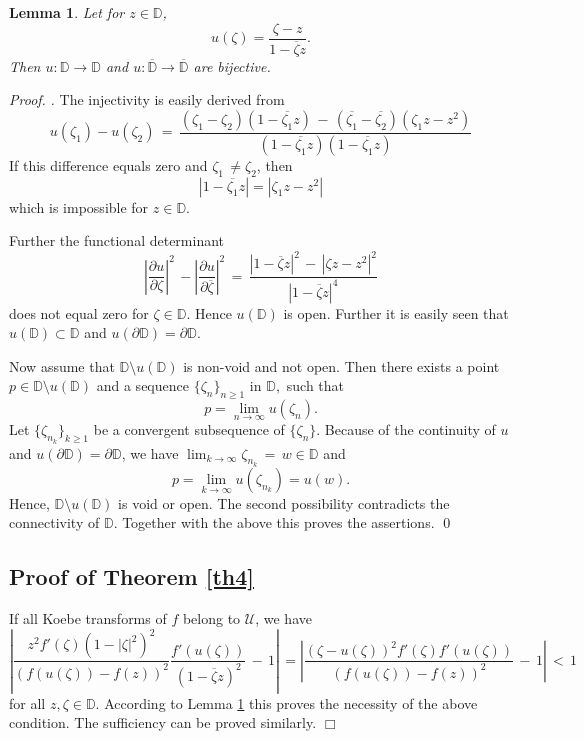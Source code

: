 \documentclass[a4paper,12pt]{amsart}
\newtheorem{lem}{Lemma}
\theoremstyle{definition}
\newenvironment{pf}[1][]{ \vskip 3mm
 \noindent
 \ifthenelse{\equal{#1}{}}  {{\slshape Proof. }}  {{\slshape #1.} } }{\qed\bigskip}
\begin{document}
\begin{lem}\label{th6} Let for $z\in {{\mathbb D}}$,
\[ u(\zeta)=\frac{\zeta - z}{1-\overline{\zeta}z}.
\]
Then $u:{{\mathbb D}}\to{{\mathbb D}}$ and $u:\overline{{\mathbb D}} \to \overline{{\mathbb D}}$ are bijective.
\end{lem}
\begin{pf}
The injectivity is easily derived from
\[ u(\zeta_1)-u(\zeta_2)
\,=\,\frac{(\zeta_1-\zeta_2)(1-\overline{\zeta_1}z)\,-\,(\overline{\zeta_1}-\overline{\zeta_2})(\zeta_1z-z^2)}{(1-\overline{\zeta_1}z)(1-\overline{\zeta_1}z)}\]
If this difference equals zero and $\zeta_1\,\neq \zeta_2$, then
\[ |1-\overline{\zeta_1}z|=|\zeta_1z-z^2|
\]
which is impossible for $z\in {{\mathbb D}}$.

Further the functional determinant
\[ \left|\frac{\partial u}{\partial \zeta}\right|^2\,-\left|\frac{\partial u}{\partial \overline{\zeta}}\right|^2
\,=\,\frac{|1-\overline{\zeta}z|^2\,-\,|\zeta z-z^2|^2}{|1-\overline{\zeta}z|^4}
\]
does not equal zero for $\zeta \in {{\mathbb D}}$. Hence $u({{\mathbb D}})$ is open. Further it is easily seen that $u({{\mathbb D}})\subset {{\mathbb D}}$ and $u(\partial {{\mathbb D}})=\partial {{\mathbb D}}.$

Now assume that ${{\mathbb D}}\setminus u({{\mathbb D}})$ is non-void and not open. Then there exists a point $p\in {{\mathbb D}}\setminus u({{\mathbb D}})$ and a
sequence $\{\zeta_n\}_{n\geq 1}$ in ${{\mathbb D}},$ such that
\[ p=\lim_{n\to\infty}u(\zeta_n).
\]
Let $\{\zeta_{n_k}\}_{k\geq 1}$ be a convergent subsequence of $\{\zeta_n\}$. Because of the continuity of $u$ and $u(\partial {{\mathbb D}})=\partial {{\mathbb D}}$,
we have $\lim_{k\to\infty}\zeta_{n_k}\,=\,w \in {{\mathbb D}}$ and
\[ p=\lim_{k\to\infty}u(\zeta_{n_k})=u(w).
\]
Hence, ${{\mathbb D}}\setminus u({{\mathbb D}})$ is void or open. The second possibility contradicts the connectivity of ${{\mathbb D}}$.
Together with the above this proves the assertions.
\end{pf}

\subsection{Proof of Theorem \ref{th4}} If all Koebe transforms of $f$ belong to  $ \mathcal{U}$, we have
\[\left|\frac{z^2f'(\zeta)(1-|\zeta|^2)^2}{(f(u(\zeta))-f(z))^2}\frac{f'(u(\zeta))}{(1-\overline{\zeta}z)^2}\,-\,1\right|\,=
\left|\frac{(\zeta-u(\zeta))^2f'(\zeta)f'(u(\zeta))}{(f(u(\zeta))-f(z))^2}\,-\,1\right|\,<\,1
\]
for all $z,\zeta \in {{\mathbb D}}$. According to Lemma \ref{th6} this proves the necessity of the above condition.
The sufficiency can be proved similarly. \hfill $\Box$
\end{document}
